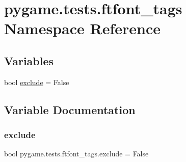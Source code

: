 \hypertarget{namespacepygame_1_1tests_1_1ftfont__tags}{}\section{pygame.\+tests.\+ftfont\+\_\+tags Namespace Reference}
\label{namespacepygame_1_1tests_1_1ftfont__tags}
\subsection*{Variables}
\begin{DoxyCompactItemize}
\item 
bool \hyperlink{namespacepygame_1_1tests_1_1ftfont__tags_a5af1fae9a73ed9815474650a3ac4ea61}{exclude} = False
\end{DoxyCompactItemize}


\subsection{Variable Documentation}
\mbox{\label{namespacepygame_1_1tests_1_1ftfont__tags_a5af1fae9a73ed9815474650a3ac4ea61}} 
\subsubsection{\texorpdfstring{exclude}{exclude}}
{\footnotesize\ttfamily bool pygame.\+tests.\+ftfont\+\_\+tags.\+exclude = False}

